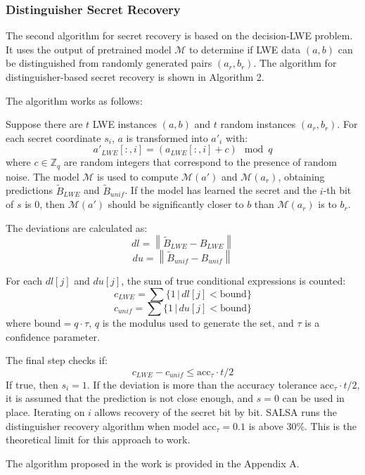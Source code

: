 \documentclass{article}
\begin{document}
\subsubsection{Distinguisher Secret Recovery}

The second algorithm for secret recovery is based on the decision-LWE problem. It uses the output of pretrained model \( \mathcal{M} \) to determine if LWE data \((a, b)\) can be distinguished from randomly generated pairs \((a_r, b_r)\). The algorithm for distinguisher-based secret recovery is shown in Algorithm 2.

The algorithm works as follows:

Suppose there are \( t \) LWE instances \((a, b)\) and \( t \) random instances \((a_r, b_r)\). For each secret coordinate \( s_i \), \( a \) is transformed into \( a'_i \) with:
\[ a'_{LWE}[:,i] = (a_{LWE}[:,i] + c) \mod q \]
where \( c \in \mathbb{Z}_q \) are random integers that correspond to the presence of random noise. The model \( \mathcal{M} \) is used to compute \( \mathcal{M}(a') \) and \( \mathcal{M}(a_r) \), obtaining predictions \( \tilde{B}_{LWE} \) and \( \tilde{B}_{unif} \). If the model has learned the secret and the \( i \)-th bit of \( s \) is 0, then \( \mathcal{M}(a') \) should be significantly closer to \( b \) than \( \mathcal{M}(a_r) \) is to \( b_r \).

The deviations are calculated as:
\[ dl = \left\| \tilde{B}_{LWE} - B_{LWE} \right\| \]
\[ du = \left\| \tilde{B}_{unif} - B_{unif} \right\| \]

For each \( dl[j] \) and \( du[j] \), the sum of true conditional expressions is counted:
\[ c_{LWE} = \sum \{1 \, | \, dl[j] < \text{bound}\} \]
\[ c_{unif} = \sum \{1 \, | \, du[j] < \text{bound}\} \]
where \( \text{bound} = q \cdot \tau \), \( q \) is the modulus used to generate the set, and \( \tau \) is a confidence parameter.

The final step checks if:
\[ c_{LWE} - c_{unif} \leq \text{acc}_{\tau} \cdot t / 2 \]
If true, then \( s_i = 1 \). If the deviation is more than the accuracy tolerance \( \text{acc}_{\tau} \cdot t / 2 \), it is assumed that the prediction is not close enough, and \( s = 0 \) can be used in place. Iterating on \( i \) allows recovery of the secret bit by bit. SALSA runs the distinguisher recovery algorithm when model \( \text{acc}_{\tau} = 0.1 \) is above 30\%. This is the theoretical limit for this approach to work.

The algorithm proposed in the work is provided in the Appendix A.
\end{document}

